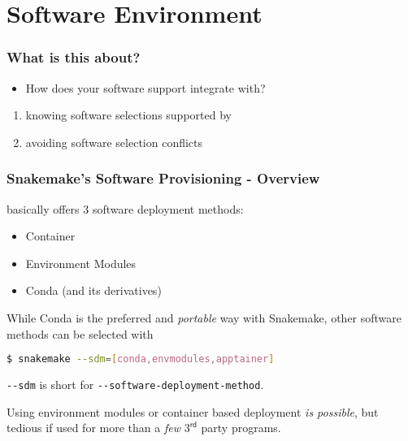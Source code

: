 \section{Software Environment}
{   
}

\begin{frame}
	\frametitle{What is this about?}
	\begin{question}[Questions]\begin{itemize}
			\item How does your software support integrate with\newline \Snakemake?
		\end{itemize}
	\end{question}
	\begin{docs}[Objectives]
	  \begin{enumerate}
			\item knowing software selections supported by \Snakemake
			\item avoiding software selection conflicts

	  \end{enumerate}
    \end{docs}
\end{frame}

\begin{frame}[fragile]
	\frametitle{Snakemake's Software Provisioning - Overview}
	\Snakemake{} basically offers 3 software deployment methods:
	\begin{itemize}[<+->]
		\item Container
		\item Environment Modules
		\item Conda (and its derivatives)
	\end{itemize}
    \pause
    While Conda is the preferred and \emph{portable} way with Snakemake, other software methods can be selected with
    \begin{lstlisting}[language=Bash, style=Shell]
$ snakemake --sdm=[conda,envmodules,apptainer]
    \end{lstlisting}
    \verb+--sdm+ is short for \verb+--software-deployment-method+.
    \pause
    \begin{hint}
    	Using environment modules or container based deployment \emph{is possible}, but tedious if used for more than a \emph{few} $3^{\mathsf{rd}}$ party programs.
    \end{hint}
\end{frame}
	
